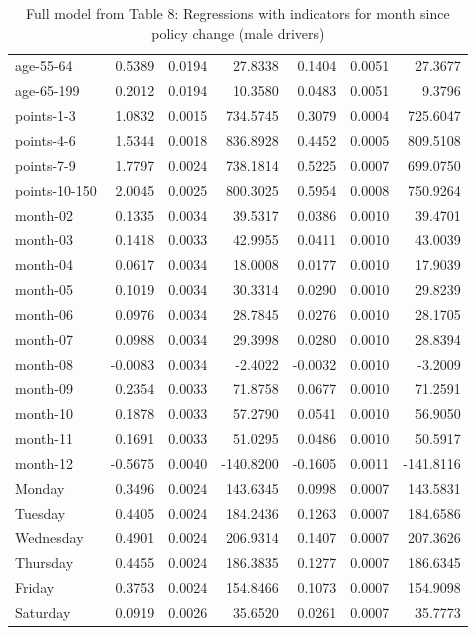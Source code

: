 \documentclass[10pt]{article}
\begin{document}
\begin{table}[ht]
\begin{tabular}{lrrrrrr}
  age-55-64 & 0.5389 & 0.0194 & 27.8338 & 0.1404 & 0.0051 & 27.3677 \\ 
  age-65-199 & 0.2012 & 0.0194 & 10.3580 & 0.0483 & 0.0051 & 9.3796 \\ 
  points-1-3 & 1.0832 & 0.0015 & 734.5745 & 0.3079 & 0.0004 & 725.6047 \\ 
  points-4-6 & 1.5344 & 0.0018 & 836.8928 & 0.4452 & 0.0005 & 809.5108 \\ 
  points-7-9 & 1.7797 & 0.0024 & 738.1814 & 0.5225 & 0.0007 & 699.0750 \\ 
  points-10-150 & 2.0045 & 0.0025 & 800.3025 & 0.5954 & 0.0008 & 750.9264 \\ 
  month-02 & 0.1335 & 0.0034 & 39.5317 & 0.0386 & 0.0010 & 39.4701 \\ 
  month-03 & 0.1418 & 0.0033 & 42.9955 & 0.0411 & 0.0010 & 43.0039 \\ 
  month-04 & 0.0617 & 0.0034 & 18.0008 & 0.0177 & 0.0010 & 17.9039 \\ 
  month-05 & 0.1019 & 0.0034 & 30.3314 & 0.0290 & 0.0010 & 29.8239 \\ 
  month-06 & 0.0976 & 0.0034 & 28.7845 & 0.0276 & 0.0010 & 28.1705 \\ 
  month-07 & 0.0988 & 0.0034 & 29.3998 & 0.0280 & 0.0010 & 28.8394 \\ 
  month-08 & -0.0083 & 0.0034 & -2.4022 & -0.0032 & 0.0010 & -3.2009 \\ 
  month-09 & 0.2354 & 0.0033 & 71.8758 & 0.0677 & 0.0010 & 71.2591 \\ 
  month-10 & 0.1878 & 0.0033 & 57.2790 & 0.0541 & 0.0010 & 56.9050 \\ 
  month-11 & 0.1691 & 0.0033 & 51.0295 & 0.0486 & 0.0010 & 50.5917 \\ 
  month-12 & -0.5675 & 0.0040 & -140.8200 & -0.1605 & 0.0011 & -141.8116 \\ 
  Monday & 0.3496 & 0.0024 & 143.6345 & 0.0998 & 0.0007 & 143.5831 \\ 
  Tuesday & 0.4405 & 0.0024 & 184.2436 & 0.1263 & 0.0007 & 184.6586 \\ 
  Wednesday & 0.4901 & 0.0024 & 206.9314 & 0.1407 & 0.0007 & 207.3626 \\ 
  Thursday & 0.4455 & 0.0024 & 186.3835 & 0.1277 & 0.0007 & 186.6345 \\ 
  Friday & 0.3753 & 0.0024 & 154.8466 & 0.1073 & 0.0007 & 154.9098 \\ 
  Saturday & 0.0919 & 0.0026 & 35.6520 & 0.0261 & 0.0007 & 35.7773 \\ 
   \hline
\end{tabular}
\caption{Full model from Table 8: Regressions with indicators for month since policy change (male drivers)} 
\label{tab_8_all_pts_no_age_M}
\end{table}
\end{document}
